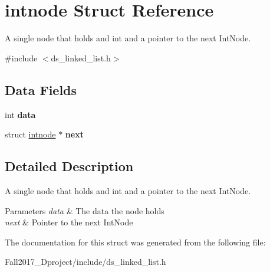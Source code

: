 \hypertarget{structintnode}{}\section{intnode Struct Reference}
\label{structintnode}


A single node that holds and int and a pointer to the next Int\+Node.  




{\ttfamily \#include $<$ds\+\_\+linked\+\_\+list.\+h$>$}

\subsection*{Data Fields}
\begin{DoxyCompactItemize}
\item 
\mbox{\label{structintnode_a9eab91667db4d35c7231dcddf7b89a76}} 
int {\bfseries data}
\item 
\mbox{\label{structintnode_a2996fdf7cf43156b803fc387b36daab2}} 
struct \hyperlink{structintnode}{intnode} $\ast$ {\bfseries next}
\end{DoxyCompactItemize}


\subsection{Detailed Description}
A single node that holds and int and a pointer to the next Int\+Node. 


\begin{DoxyParams}{Parameters}
{\em data} & The data the node holds \\
\hline
{\em next} & Pointer to the next Int\+Node \\
\hline
\end{DoxyParams}


The documentation for this struct was generated from the following file\+:\begin{DoxyCompactItemize}
\item 
Fall2017\+\_\+Dproject/include/ds\+\_\+linked\+\_\+list.\+h\end{DoxyCompactItemize}

